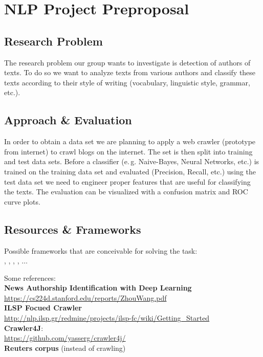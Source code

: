 \documentclass{scrartcl}
\begin{document}
\enlargethispage{4\baselineskip}
\section{NLP Project Preproposal}

\vspace*{-3mm}
\subsection{Research Problem}
\vspace*{-3mm}
The research problem our group wants to investigate is detection of authors of texts. To do so we want to analyze texts from various authors and classify these texts according to their style of writing (vocabulary, linguistic style, grammar, etc.).

\vspace*{-3mm}
\subsection{Approach \& Evaluation}
\vspace*{-3mm}
In order to obtain a data set we are planning to apply a web crawler (prototype from internet) to crawl blogs on the internet. The set is then split into training and test data sets. Before a classifier (e.\,g. Naive-Bayes, Neural Networks, etc.) is trained on the training data set and evaluated (Precision, Recall, etc.) using the test data set we need to engineer proper features that are useful for classifying the texts. The evaluation can be visualized with a confusion matrix and ROC curve plots.

\vspace*{-3mm}
\subsection{Resources \& Frameworks}
\vspace*{-3mm}
Possible frameworks that are conceivable for solving the task: \\
, , , , $\dots$

Some references: \\
\textbf{News Authorship Identification with Deep Learning} \\
\url{https://cs224d.stanford.edu/reports/ZhouWang.pdf} \\
\textbf{ILSP Focued Crawler} \\
\url{http://nlp.ilsp.gr/redmine/projects/ilsp-fc/wiki/Getting_Started} \\
\textbf{Crawler4J}: \\
\url{https://github.com/yasserg/crawler4j/} \\
\textbf{Reuters corpus} (instead of crawling)
\end{document}
